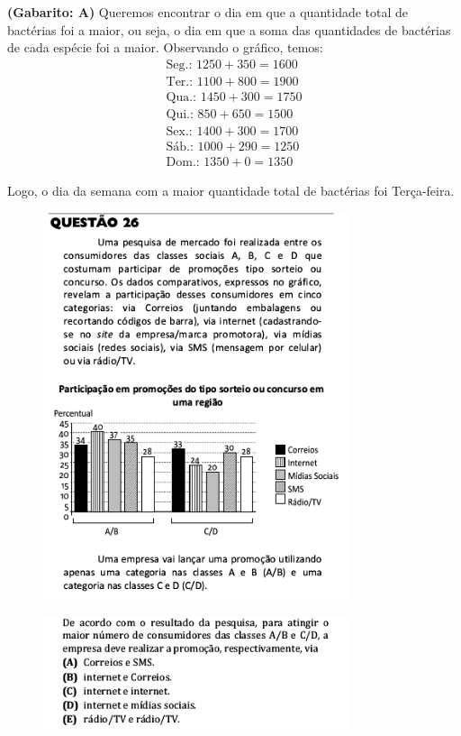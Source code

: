 \documentclass[a4paper]{article}
\begin{document}
\par\textbf{(Gabarito: A)} Queremos encontrar o dia em que a quantidade total de bactérias foi a maior, ou seja, o dia em que a soma das quantidades de bactérias de cada espécie foi a maior. Observando o gráfico, temos:
\begin{align*}
\text{Seg.: }1250+350 = 1600 \\
\text{Ter.: }1100+800 = 1900 \\
\text{Qua.: }1450+300 = 1750 \\
\text{Qui.: }850+650 = 1500 \\
\text{Sex.: }1400+300 = 1700 \\
\text{Sáb.: }1000+290 = 1250 \\
\text{Dom.: }1350+0 = 1350
\end{align*}
\par\vspace{0.3cm} Logo, o dia da semana com a maior quantidade total de bactérias foi Terça-feira.
\begin{figure}[H]
	\begin{center}
		\includegraphics[width=9cm]{L1Q26_1.png}
	\end{center}
\end{figure}
\begin{figure}[H]
	\begin{center}
		\includegraphics[width=9cm]{L1Q26_2.png}
	\end{center}
\end{figure}
\end{document}
